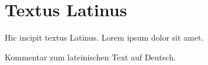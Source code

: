 \chapter{Textus Latinus}
Hic incipit textus Latinus. Lorem ipsum dolor sit amet.

Kommentar zum lateinischen Text auf Deutsch.